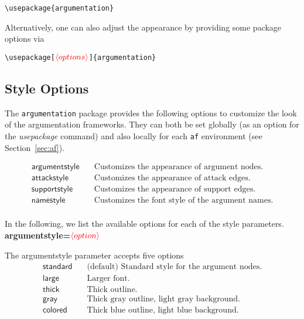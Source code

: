 \documentclass[headings=normal]{scrartcl}
\newcommand{\argumentation}{\texttt{argumentation}\xspace}
\newcommand{\opt}[2][red]{\ensuremath{\textcolor{#1}{\langle #2\rangle}}}
\begin{document}
    \verb|\usepackage{argumentation}|

    \noindent
    Alternatively, one can also adjust the appearance by providing some package options via

    \verb|\usepackage[|\opt{options}\verb|]{argumentation}|


\subsection{Style Options}\label{sec:style}
    \begin{list}{}{\leftmargin=\parindent\rightmargin=0pt}
        \item The \argumentation package provides the following options to customize the look of the argumentation frameworks. They can both be set globally (as an option for the \emph{usepackage} command) and also locally for each \texttt{af} environment (see Section~\ref{sec:af}).
    \end{list}
    \vspace{-0.3cm}
    \begin{align*}
        \mathsf{argumentstyle} &\quad \text{Customizes the appearance of argument nodes.}\\
        \mathsf{attackstyle} &\quad \text{Customizes the appearance of attack edges.}\\
        \mathsf{supportstyle} &\quad \text{Customizes the appearance of support edges.}\\
        \mathsf{namestyle} &\quad \text{Customizes the font style of the argument names.}\\
    \end{align*}

    In the following, we list the available options for each of the style parameters.\\

{\bfseries\sffamily\noindent argumentstyle=\opt{option}}

    The \textsf{argumentstyle} parameter accepts five options
    \begin{align*}
        \mathsf{standard} &\quad \text{(default) Standard style for the argument nodes.}\\
        \mathsf{large} &\quad \text{Larger font.}\\
        \mathsf{thick} &\quad \text{Thick outline.}\\
        \mathsf{gray} &\quad \text{Thick gray outline, light gray background.}\\
        \mathsf{colored} &\quad \text{Thick blue outline, light blue background.}
    \end{align*}
\end{document}

